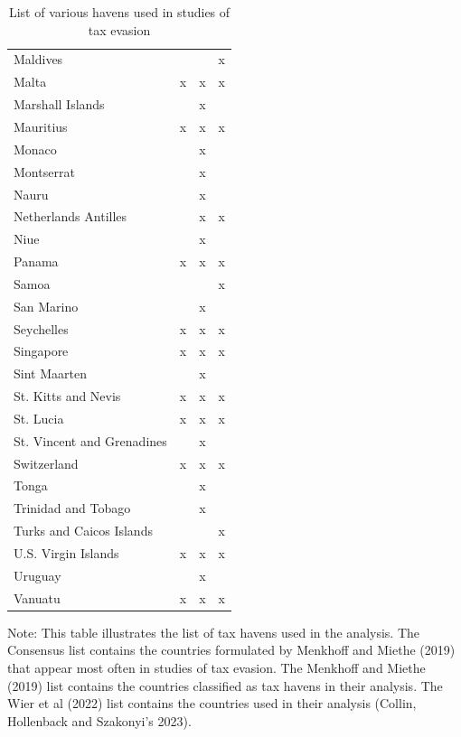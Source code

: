 \documentclass{article}
\begin{document}
\begin{table}[H]
\begin{adjustbox}{width=0.9\textwidth}
\begin{threeparttable}
\begin{tabular}{lccc}
Maldives &  &  & x \\
Malta & x & x & x \\
Marshall Islands &  & x &  \\
Mauritius & x & x & x \\
Monaco &  & x &  \\
Montserrat &  & x &  \\
Nauru &  & x &  \\
Netherlands Antilles &  & x & x \\
Niue &  & x &  \\
Panama & x & x & x \\
Samoa &  &  & x \\
San Marino &  & x &  \\
Seychelles & x & x & x \\
Singapore & x & x & x \\
Sint Maarten &  & x &  \\
St. Kitts and Nevis & x & x & x \\
St. Lucia & x & x & x \\
St. Vincent and Grenadines &  & x &  \\
Switzerland & x & x & x \\
Tonga &  & x &  \\
Trinidad and Tobago &  & x &  \\
Turks and Caicos Islands &  &  & x \\
U.S. Virgin Islands & x & x & x \\
Uruguay &  & x &  \\
Vanuatu & x & x & x \\
\hline
\end{tabular}
\begin{tablenotes}
    \item Note: This table illustrates the list of tax havens used in the analysis. The Consensus list contains the countries formulated by Menkhoff and Miethe (2019) that appear most often in studies of tax evasion. The Menkhoff and Miethe (2019) list contains the countries classified as tax havens in their analysis. The Wier et al (2022) list contains the countries used in their analysis (Collin, Hollenback and Szakonyi's 2023).
\end{tablenotes}
\end{threeparttable}
\end{adjustbox}
\caption{List of various havens used in studies of tax evasion}
\label{tab:jurisdictions}
\end{table}
\end{document}
